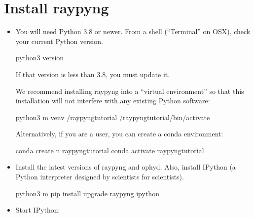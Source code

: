 \documentclass[letterpaper,10pt,english]{sphinxmanual}
\begin{document}
\section{Install raypyng}
\label{\detokenize{installation:install-raypyng}}\begin{itemize}
\item {} 
\sphinxAtStartPar
You will need Python 3.8 or newer. From a shell (“Terminal” on OSX),
check your current Python version.

\begin{sphinxVerbatim}[commandchars=\\\{\}]
python3 \PYGZhy{}\PYGZhy{}version
\end{sphinxVerbatim}

\sphinxAtStartPar
If that version is less than 3.8, you must update it.

\sphinxAtStartPar
We recommend installing raypyng into a “virtual environment” so that this
installation will not interfere with any existing Python software:

\begin{sphinxVerbatim}[commandchars=\\\{\}]
python3 \PYGZhy{}m venv \PYGZti{}/raypyng\PYGZhy{}tutorial
 \PYGZti{}/raypyng\PYGZhy{}tutorial/bin/activate
\end{sphinxVerbatim}

\sphinxAtStartPar
Alternatively, if you are a
 user,
you can create a conda environment:

\begin{sphinxVerbatim}[commandchars=\\\{\}]
conda create \PYGZhy{}n raypyng\PYGZhy{}tutorial 
conda activate raypyng\PYGZhy{}tutorial
\end{sphinxVerbatim}

\item {} 
\sphinxAtStartPar
Install the latest versions of raypyng and ophyd. Also, install IPython
(a Python interpreter designed by scientists for scientists).

\begin{sphinxVerbatim}[commandchars=\\\{\}]
python3 \PYGZhy{}m pip install \PYGZhy{}\PYGZhy{}upgrade raypyng ipython
\end{sphinxVerbatim}

\item {} 
\sphinxAtStartPar
Start IPython:


\end{itemize}
\end{document}
